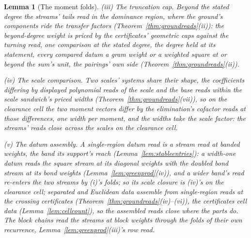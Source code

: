 \documentclass[11pt]{article}
\newtheorem{lemma}{Lemma}
\theoremstyle{definition}
\begin{document}
\begin{lemma}[The moment folds]
\emph{(iii) The truncation cap.} Beyond the stated degree the
streams' tails read in the dominance region, where the ground's
components ride the transfer factors
(Theorem~\ref{thm:groundreads}(ii)): the beyond-degree weight is
priced by the certificates' geometric caps against the turning
read, one comparison at the stated degree, the degree held at its
statement, every compared datum a gram weight or a weighted square
at or beyond the sum's unit, the pairings' own side
(Theorem~\ref{thm:groundreads}(ii)).

\emph{(iv) The scale comparison.} Two scales' systems share their
shape, the coefficients differing by displayed polynomial reads
of the scale and the base reads within the scale sandwich's
priced widths (Theorem~\ref{thm:groundreads}(vii)), so on the
clearance cell the two moment vectors differ by the elimination's
cofactor reads at those differences, one width per moment, and
the widths take the scale factor: the streams' reads close across
the scales on the clearance cell.

\emph{(v) The datum assembly.} A single-region datum read is a
stream read at banded weights, the band its support's reach
(Lemma~\ref{lem:stableentries}): a width-one datum reads the
square stream at its diagonal weights with the doubled bond stream
at its bond weights (Lemma~\ref{lem:greenprod}(iv)), and a wider
band's read re-enters the two streams by (i)'s folds; so its scale
closure is (iv)'s on the clearance cell; separated and
Euclidean data assemble from single-region reads at the crossing
certificates (Theorem~\ref{thm:groundreads}(iv)--(vi)), the
certificates cell data (Lemma~\ref{lem:cellcount}), so the
assembled reads close where the parts do. The block chains read
the streams at block weights through the folds of their own
recurrence, Lemma~\ref{lem:greenprod}(iii)'s row read.


\end{lemma}
\end{document}
